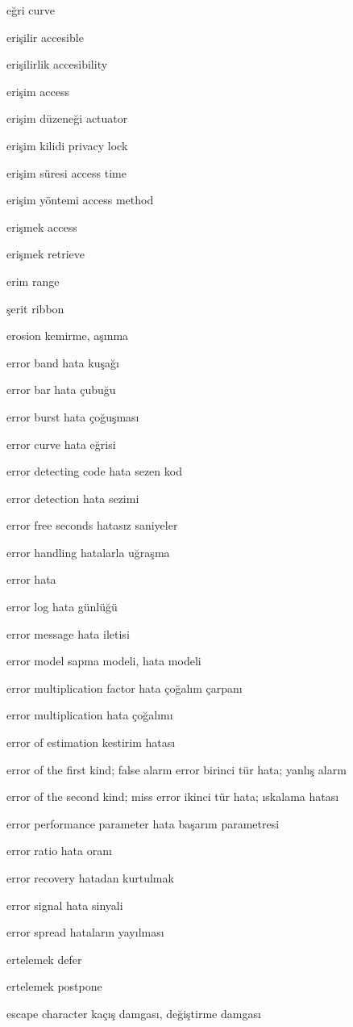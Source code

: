 \documentclass[12pt,fleqn]{article}\usepackage{../../common}
\begin{document}
eğri curve

erişilir accesible

erişilirlik accesibility

erişim access

erişim düzeneği actuator

erişim kilidi privacy lock

erişim süresi access time

erişim yöntemi access method

erişmek access

erişmek retrieve

erim range

şerit ribbon

erosion kemirme, aşınma

error band hata kuşağı

error bar hata çubuğu

error burst hata çoğuşması

error curve hata eğrisi

error detecting code hata sezen kod

error detection hata sezimi

error free seconds hatasız saniyeler

error handling hatalarla uğraşma

error hata

error log hata günlüğü

error message hata iletisi

error model sapma modeli, hata modeli

error multiplication factor hata çoğalım çarpanı

error multiplication hata çoğalımı

error of estimation kestirim hatası

error of the first kind; false alarm error birinci tür hata; yanlış alarm

error of the second kind; miss error ikinci tür hata; ıskalama hatası

error performance parameter hata başarım parametresi

error ratio hata oranı

error recovery hatadan kurtulmak

error signal hata sinyali

error spread hataların yayılması

ertelemek defer

ertelemek postpone

escape character kaçış damgası, değiştirme damgası
\end{document}
